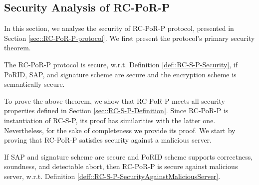 
\subsection{Security Analysis of RC-PoR-P}

In this section, we analyse the security of RC-PoR-P protocol, presented in Section \ref{sec::RC-PoR-P-protocol}. We first present the protocol's primary security theorem. 



\begin{theorem}
The RC-PoR-P protocol is secure, w.r.t. Definition \ref{def::RC-S-P-Security}, if PoRID, SAP, and signature scheme are secure and the encryption scheme is semantically secure. 
\end{theorem}


 To prove the above theorem, we show that RC-PoR-P meets all security properties defined in Section \ref{sec::RC-S-P-Definition}.  Since RC-PoR-P is instantiation of RC-S-P, its proof has  similarities with the latter one. Nevertheless, for the sake of completeness we provide its proof. We start by proving that RC-PoR-P satisfies security against a malicious server.   


 \begin{lemma}\label{lemma::RC-PoR-P-SecurityAgainstMaliciousServer}
 If SAP and signature scheme are secure and  PoRID scheme supports correctness, soundness, and detectable abort, then RC-PoR-P is secure against malicious server, w.r.t. Definition \ref{deff::RC-S-P-SecurityAgainstMaliciousServer}. 
 \end{lemma}
 

